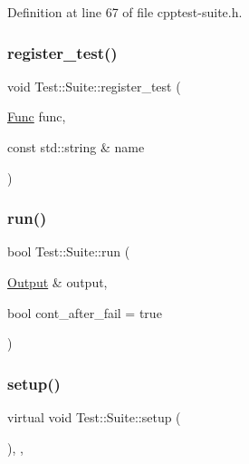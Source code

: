 Definition at line 67 of file cpptest-\/suite.\+h.

\mbox{\label{class_test_1_1_suite_a11e542d1d45905b817b00c35660700b9}} 
\subsubsection{\texorpdfstring{register\+\_\+test()}{register\_test()}}
{\footnotesize\ttfamily void Test\+::\+Suite\+::register\+\_\+test (\begin{DoxyParamCaption}\item[{\mbox{\hyperlink{class_test_1_1_suite_a87c40a9c763fc3221bee0e70c431038f}{Func}}}]{func,  }\item[{const std\+::string \&}]{name }\end{DoxyParamCaption})\hspace{0.3cm}{\ttfamily [protected]}}

\mbox{\label{class_test_1_1_suite_ad17746e218da79c537bc9d21e389f570}} 
\subsubsection{\texorpdfstring{run()}{run()}}
{\footnotesize\ttfamily bool Test\+::\+Suite\+::run (\begin{DoxyParamCaption}\item[{\mbox{\hyperlink{class_test_1_1_output}{Output}} \&}]{output,  }\item[{bool}]{cont\+\_\+after\+\_\+fail = {\ttfamily true} }\end{DoxyParamCaption})}

\mbox{\label{class_test_1_1_suite_aa022f93f2bc7c0ca4f8bf0bb94758226}} 
\subsubsection{\texorpdfstring{setup()}{setup()}}
{\footnotesize\ttfamily virtual void Test\+::\+Suite\+::setup (\begin{DoxyParamCaption}{ }\end{DoxyParamCaption})\hspace{0.3cm}{\ttfamily [inline]}, {\ttfamily [protected]}, {\ttfamily [virtual]}}



